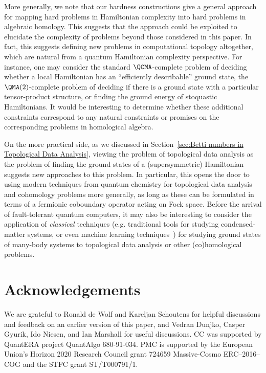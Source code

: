 \documentclass[11pt]{article}
\numberwithin{equation}{section}
\renewcommand\( {\left(}
\renewcommand\) {\right)}
\begin{document}
More generally, we note that our hardness constructions give a general approach for mapping hard problems in Hamiltonian complexity into hard problems in algebraic homology. This suggests that the approach could be exploited to elucidate the complexity of problems  beyond those considered in this paper.  In fact, this suggests defining new problems in computational topology altogether, which are natural from a quantum Hamiltonian complexity perspective.  For instance, one may consider the standard $\QCMA$-complete problem of deciding whether a local Hamiltonian has an ``efficiently describable'' ground state, the $\QMA(2)$-complete problem of deciding if there is a ground state with a particular tensor-product structure, or finding the ground energy of stoquastic Hamiltonians. It would be interesting to determine whether these additional constraints correspond to any natural constraints or promises on the corresponding  problems in homological algebra.

On the more practical side, as we discussed in Section~\ref{sec:Betti numbers in Topological Data Analysis}, viewing the problem of topological data analysis as the problem of finding the ground states of a (supersymmetric) Hamiltonian suggests new approaches to this problem.  In particular, this opens the door to using modern techniques from quantum chemistry for topological data analysis and cohomology problems more generally, as long as these can be formulated in terms of a fermionic coboundary operator acting on Fock space. Before the arrival of fault-tolerant quantum computers, it may also be interesting to consider the application of {\it classical} techniques (e.g. traditional tools for studying condensed-matter systems, or even machine learning techniques~\cite{huang2021provably}) for studying ground states of many-body systems to topological data analysis or other (co)homological problems.

\section*{Acknowledgements}
We are grateful to Ronald de Wolf and Kareljan Schoutens for helpful discussions and feedback on an earlier version of this paper, and Vedran Dunjko, Casper Gyurik, Ido Niesen, and Ian Marshall for useful discussions. CC was supported by QuantERA project QuantAlgo 680-91-034. PMC is supported by the European Union’s Horizon 2020 Research Council grant 724659 Massive-Cosmo ERC–2016–COG and the STFC grant ST/T000791/1.
\end{document}
